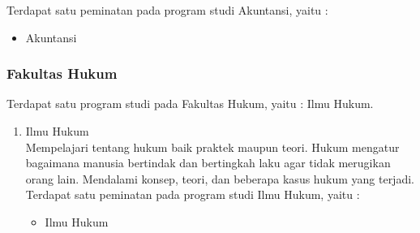 \begin{enumerate}
			Terdapat satu peminatan pada program studi Akuntansi, yaitu :
			\begin{itemize}
				\item Akuntansi
			\end{itemize}\leavevmode
		
			
	\end{enumerate}\leavevmode

\subsubsection{Fakultas Hukum}
Terdapat satu program studi pada Fakultas Hukum, yaitu : Ilmu Hukum.

	\begin{enumerate}
		\item Ilmu Hukum\\
			Mempelajari tentang hukum baik praktek maupun teori. Hukum mengatur bagaimana manusia bertindak dan bertingkah laku agar tidak merugikan orang lain. Mendalami konsep, teori, dan beberapa kasus hukum yang terjadi.\\
			
			Terdapat satu peminatan pada program studi Ilmu Hukum, yaitu :
			
			\begin{itemize}
				\item Ilmu Hukum
			\end{itemize}\leavevmode
			
	\end{enumerate}\leavevmode

